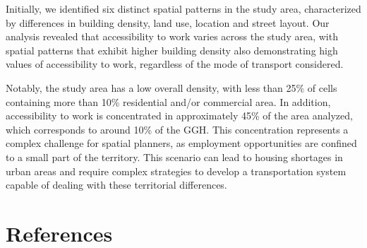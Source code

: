 \documentclass[conference,final,]{IEEEtran}
\begin{document}
Initially, we identified six distinct spatial patterns in the study
area, characterized by differences in building density, land use,
location and street layout. Our analysis revealed that accessibility to
work varies across the study area, with spatial patterns that exhibit
higher building density also demonstrating high values of accessibility
to work, regardless of the mode of transport considered.

Notably, the study area has a low overall density, with less than 25\%
of cells containing more than 10\% residential and/or commercial area.
In addition, accessibility to work is concentrated in approximately 45\%
of the area analyzed, which corresponds to around 10\% of the GGH. This
concentration represents a complex challenge for spatial planners, as
employment opportunities are confined to a small part of the territory.
This scenario can lead to housing shortages in urban areas and require
complex strategies to develop a transportation system capable of dealing
with these territorial differences.

\hypertarget{references}{%
\section*{References}\label{references}}
\end{document}
